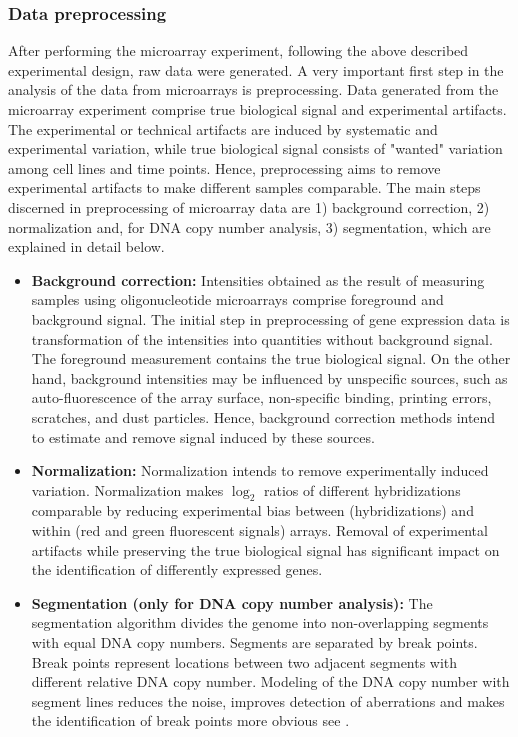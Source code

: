 \subsubsection{Data preprocessing}

After performing the microarray experiment, following the above described experimental design, raw data were generated. A very important first step in the analysis of the data from microarrays is preprocessing. Data generated from the microarray experiment comprise true biological signal and experimental artifacts. The experimental or technical artifacts are induced by systematic and experimental variation, while true biological signal consists of "wanted" variation among cell lines and time points. Hence, preprocessing aims to remove experimental artifacts to make different samples comparable. The main steps discerned in preprocessing of microarray data are 1) background correction, 2) normalization and, for DNA copy number analysis, 3) segmentation, which are explained in detail below.

\begin{itemize}  
\item \textbf{Background correction:} Intensities obtained as the result of measuring samples using oligonucleotide microarrays comprise foreground and background signal. The initial step in preprocessing of gene expression data is transformation of the intensities into quantities without background signal. The foreground measurement contains the true biological signal. On the other hand, background intensities may be influenced by unspecific sources, such as auto-fluorescence of the array surface, non-specific binding, printing errors, scratches, and dust particles. Hence, background correction methods intend to estimate and remove signal induced by these sources.

\item \textbf{Normalization:} Normalization intends to remove experimentally induced variation. Normalization makes $\log_2$ ratios of different hybridizations comparable by reducing experimental bias between (hybridizations) and within (red and green fluorescent signals) arrays. Removal of experimental artifacts while preserving the true biological signal has significant impact on the identification of differently expressed genes.

\item \textbf{Segmentation (only for DNA copy number analysis):} The segmentation algorithm divides the genome into non-overlapping segments with equal DNA copy numbers. Segments are separated by break points. Break points represent locations between two adjacent segments with different relative DNA copy number. Modeling of the DNA copy number with segment lines reduces the noise, improves detection of aberrations and makes the identification of break points more obvious see \cite{Wiel2011}.
\end{itemize}
 

